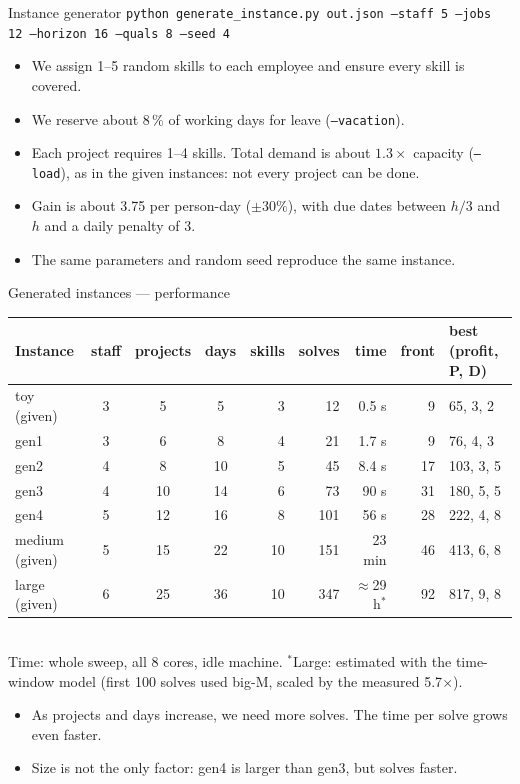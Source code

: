 \documentclass[aspectratio=169,11pt]{beamer}
\begin{document}
\begin{frame}{Instance generator}
\texttt{python generate\_instance.py out.json --staff 5 --jobs 12 --horizon 16 --quals 8 --seed 4}
\vspace{0.5em}
\begin{itemize}
  \item We assign 1--5 random skills to each employee and ensure every skill is covered.
  \item We reserve about 8\,\% of working days for leave (\texttt{--vacation}).
  \item Each project requires 1--4 skills. Total demand is about $1.3\times$ capacity (\texttt{--load}), as in the given instances: \alert{not every project can be done}.
  \item Gain is about 3.75 per person-day ($\pm30\%$), with due dates between $h/3$ and $h$ and a daily penalty of 3.
  \item The same parameters and random seed reproduce the same instance.
\end{itemize}
\end{frame}

\begin{frame}{Generated instances --- performance}
\centering\footnotesize
\begin{tabular}{lcccrrrrl}
\toprule
Instance & staff & projects & days & skills & solves & time & front & best (profit, P, D)\\
\midrule
toy (given) & 3 & 5 & 5 & 3 & 12 & 0.5 s & 9 & 65, 3, 2\\
gen1 & 3 & 6 & 8 & 4 & 21 & 1.7 s & 9 & 76, 4, 3\\
gen2 & 4 & 8 & 10 & 5 & 45 & 8.4 s & 17 & 103, 3, 5\\
gen3 & 4 & 10 & 14 & 6 & 73 & 90 s & 31 & 180, 5, 5\\
gen4 & 5 & 12 & 16 & 8 & 101 & 56 s & 28 & 222, 4, 8\\
medium (given) & 5 & 15 & 22 & 10 & 151 & 23 min & 46 & 413, 6, 8\\
large (given) & 6 & 25 & 36 & 10 & 347 & $\approx$29 h$^*$ & 92 & 817, 9, 8\\
\bottomrule
\end{tabular}\\[0.2em]
{\scriptsize Time: whole sweep, all 8 cores, idle machine. $^*$Large: estimated with the time-window model (first 100 solves used big-M, scaled by the measured 5.7$\times$).}
\vspace{0.5em}
\begin{itemize}
  \item As projects and days increase, we need more solves. The time per solve grows even faster.
  \item Size is not the only factor: gen4 is larger than gen3, but solves faster.
\end{itemize}
\end{frame}
\end{document}
